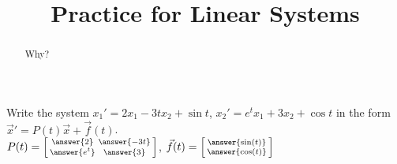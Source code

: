\documentclass{ximera}
\title{Practice for Linear Systems}
\begin{document}
\begin{abstract}
Why?
\end{abstract}
\maketitle



\begin{exercise}
    Write the system $x_1' = 2 x_1 - 3t x_2 + \sin t$, $x_2' = e^t x_1 + 3 x_2 + \cos t$ in the form ${\vec{x}}' = P(t) \vec{x} + \vec{f}(t)$.\\
    $P(t) = \left[\begin{smallmatrix} \answer{2} & \answer{-3t} \\ \answer{e^t} & \answer{3} \end{smallmatrix}\right]$, $\vec{f}(t) = \left[\begin{smallmatrix}  \answer{\sin(t)} \\ \answer{\cos(t)} \end{smallmatrix}\right]$
\end{exercise}
\end{document}
